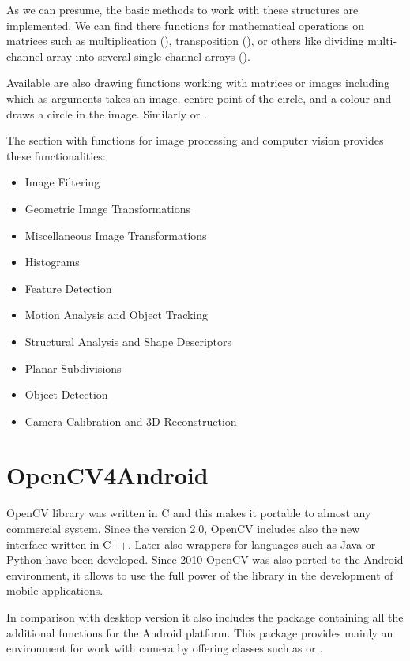 As we can presume, the basic methods to work with these structures are implemented.
We can find there functions for mathematical operations on matrices such as multiplication (), transposition (), or
others like dividing multi-channel array into several single-channel arrays ().

Available are also drawing functions working with matrices or images including  which as arguments takes an image, centre point of the circle,
and a colour and draws a circle in the image. Similarly  or .


The section with functions for image processing and computer vision provides these functionalities:
\begin{itemize}

  \item Image Filtering
  \item Geometric Image Transformations
  \item Miscellaneous Image Transformations
  \item Histograms
  \item Feature Detection
  \item Motion Analysis and Object Tracking
  \item Structural Analysis and Shape Descriptors
  \item Planar Subdivisions
  \item Object Detection
  \item Camera Calibration and 3D Reconstruction

\end{itemize}


\section{OpenCV4Android}
OpenCV library was written in C and this makes it portable to almost any commercial system.
Since the version 2.0, OpenCV includes also the new interface written in C++. 
Later also wrappers for languages such as Java or Python have been developed. 
Since 2010 OpenCV was also ported to the Android environment, it allows to use the full power of the library in the development of mobile applications.

In comparison with desktop version it also includes the  package containing all the additional functions for the Android platform.
This package provides mainly an environment for work with camera by offering classes such as   or  .

